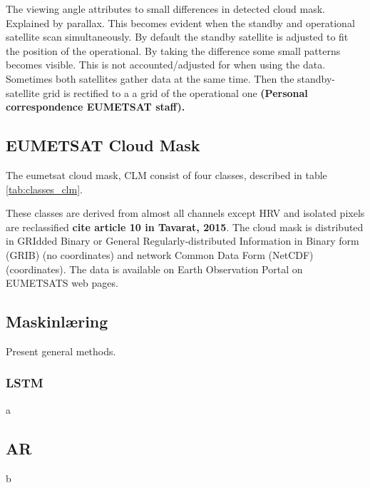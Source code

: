 The viewing angle attributes to small differences in detected cloud mask. Explained by parallax. This becomes evident when the standby and operational satellite scan simultaneously. By default the standby satellite is adjusted to fit the position of the operational. By taking the difference some small patterns becomes visible. This is not accounted/adjusted for when using the data. Sometimes both satellites gather data at the same time. Then the standby-satellite grid is rectified to a a grid of the operational one \textbf{(Personal correspondence EUMETSAT staff).} 

\subsection{EUMETSAT Cloud Mask} \label{sec:EUMETSAT_cloud_mask}

The \acrshort{eumetsat} cloud mask, CLM consist of four classes, described in table \ref{tab:classes_clm}.




These classes are derived from almost all channels except HRV and isolated pixels are reclassified \textbf{cite article 10 in Tavarat, 2015}. The cloud mask is distributed in GRIdded Binary or General Regularly-distributed Information in Binary form (GRIB) (no coordinates) and network Common Data Form (NetCDF) (coordinates). The data is available on Earth Observation Portal on EUMETSATS web pages. 

\subsection{Maskinlæring}
Present general methods.

\subsubsection{LSTM}
a

\subsection{AR}
b


